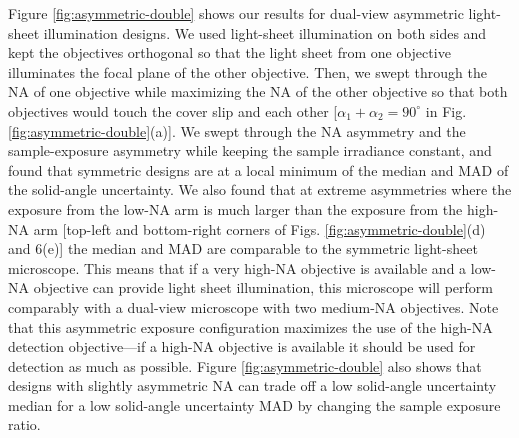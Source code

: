 \documentclass[10pt]{article}
\begin{document}
Figure \ref{fig:asymmetric-double} shows our results for dual-view asymmetric
light-sheet illumination designs. We used light-sheet illumination on both sides
and kept the objectives orthogonal so that the light sheet from one objective
illuminates the focal plane of the other objective. Then, we swept through the
NA of one objective while maximizing the NA of the other objective so that both
objectives would touch the cover slip and each other
{\color{urlblue}[}$\alpha_1 + \alpha_2 = 90^{\circ}$ in {\color{urlblue}Fig.}
\ref{fig:asymmetric-double}{\color{urlblue}(a)}{\color{urlblue}]}. We swept
through the NA asymmetry and the sample-exposure asymmetry while keeping the
sample irradiance constant, and found that symmetric designs are at a local
minimum of the median and MAD of the solid-angle uncertainty. We also found that
at extreme asymmetries where the exposure from the low-NA arm is much larger
than the exposure from the high-NA arm {\color{urlblue}[}top-left and
bottom-right corners of {\color{urlblue}Figs.}
\ref{fig:asymmetric-double}{\color{urlblue}(d)} and {\color{urlblue}6(e)]} the
median and MAD are comparable to the symmetric light-sheet microscope. This
means that if a very high-NA objective is available and a low-NA objective can
provide light sheet illumination, this microscope will perform comparably with a
dual-view microscope with two medium-NA objectives. Note that this asymmetric
exposure configuration maximizes the use of the high-NA detection objective---if
a high-NA objective is available it should be used for detection as much as
possible. Figure \ref{fig:asymmetric-double} also shows that
designs with slightly asymmetric NA can trade off a low solid-angle uncertainty
median for a low solid-angle uncertainty MAD by changing the sample exposure
ratio.
\end{document}
